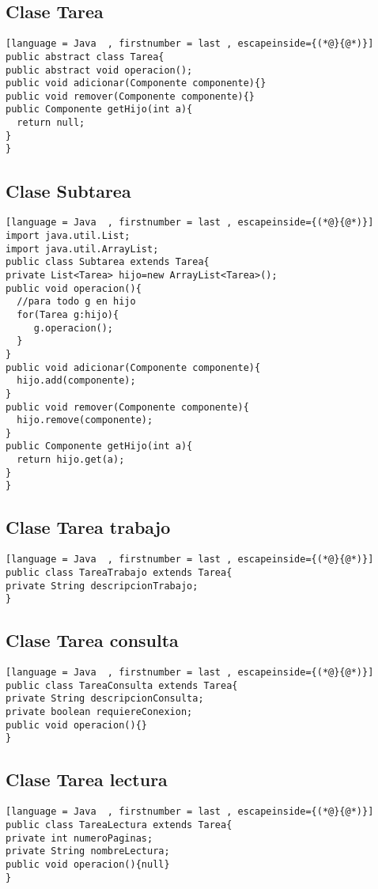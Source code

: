 \subsection{Clase Tarea}
\begin{lstlisting}[language = Java  , firstnumber = last , escapeinside={(*@}{@*)}]
public abstract class Tarea{
public abstract void operacion();
public void adicionar(Componente componente){}
public void remover(Componente componente){}
public Componente getHijo(int a){
  return null;
}
}
\end{lstlisting}

\subsection{Clase Subtarea}
\begin{lstlisting}[language = Java  , firstnumber = last , escapeinside={(*@}{@*)}]
import java.util.List;
import java.util.ArrayList;
public class Subtarea extends Tarea{
private List<Tarea> hijo=new ArrayList<Tarea>();
public void operacion(){
  //para todo g en hijo
  for(Tarea g:hijo){
     g.operacion();
  }
}
public void adicionar(Componente componente){
  hijo.add(componente);
}
public void remover(Componente componente){
  hijo.remove(componente);
}
public Componente getHijo(int a){
  return hijo.get(a);
}
}
\end{lstlisting}

\subsection{Clase Tarea trabajo}
\begin{lstlisting}[language = Java  , firstnumber = last , escapeinside={(*@}{@*)}]
public class TareaTrabajo extends Tarea{
private String descripcionTrabajo;
}
\end{lstlisting}

\subsection{Clase Tarea consulta}
\begin{lstlisting}[language = Java  , firstnumber = last , escapeinside={(*@}{@*)}]
public class TareaConsulta extends Tarea{
private String descripcionConsulta;
private boolean requiereConexion;
public void operacion(){}
}
\end{lstlisting}

\subsection{Clase Tarea lectura}
\begin{lstlisting}[language = Java  , firstnumber = last , escapeinside={(*@}{@*)}]
public class TareaLectura extends Tarea{
private int numeroPaginas;
private String nombreLectura;
public void operacion(){null}
}
\end{lstlisting}

